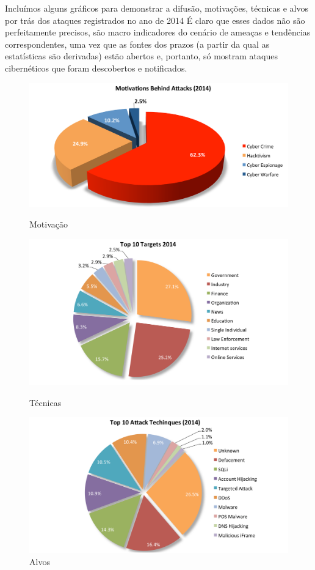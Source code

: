 Incluímos alguns gráficos para demonstrar a difusão, motivações, técnicas e alvos por trás dos ataques registrados no ano de 2014
É claro que esses dados não são perfeitamente precisos, são macro indicadores do cenário de ameaças e tendências correspondentes, uma vez que as fontes dos prazos (a partir da qual as estatísticas são derivadas) estão abertos e, portanto, só mostram ataques cibernéticos que foram descobertos e notificados.




\begin{figure}
	\begin{minipage}{.5\textwidth}
		\includegraphics[scale=0.2]{Imagens/hackmageddon_motivation.png}
		\caption{Motivação}
	\end{minipage}
	\begin{minipage}{.5\textwidth}
		\includegraphics[scale=0.2]{Imagens/hackmageddon_targets.png}
		\caption{Técnicas}
	\end{minipage}
	\begin{minipage}{.5\textwidth}
		\includegraphics[scale=0.2]{Imagens/hackmageddon_techniques.png}
		\caption{Alvos}
	\end{minipage}
\end{figure}

